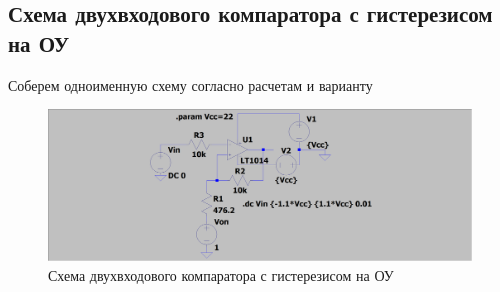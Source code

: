 \documentclass[a4paper, 12pt]{article}
\begin{document}
    \subsection{Схема двухвходового компаратора с гистерезисом на ОУ}
    Соберем одноименную схему согласно расчетам и варианту
    \begin{figure}[H]
        \centering
        \includegraphics[scale=0.22]{scheme8.png}
        \captionsetup{skip=0pt}
        \caption{Схема двухвходового компаратора с гистерезисом на ОУ}
        \label{fig:scheme8}
    \end{figure}
\end{document}
